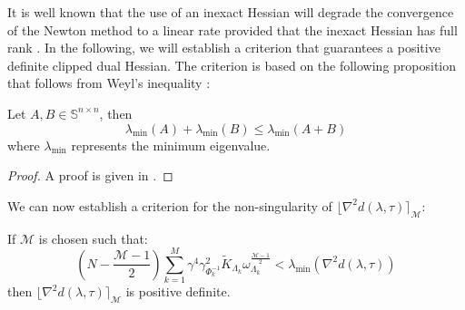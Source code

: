 It is well known that the use of an inexact Hessian will degrade the convergence of the Newton method to a linear rate provided that the inexact Hessian has full rank \cite{Nocedal2006}. In the following, we will establish a criterion that guarantees a positive definite clipped dual Hessian. The criterion is based on the following proposition that follows from Weyl's inequality \cite{HornR2013}:
\begin{proposition} \label{p:Weyl}
Let $A, B \in \mathbb{S}^{n \times n}$, then
\begin{equation} \label{e:minEigenvalueLemma}
\lambda_{\min} (A) + \lambda_{\min} (B) \leq \lambda_{\min} (A + B)
\end{equation} 
where $\lambda_{\min}$ represents the minimum eigenvalue.
\end{proposition}
\begin{proof}
A proof is given in \cite{HornR2013}.
\end{proof}
We can now establish a criterion for the non-singularity of $\lfloor \nabla^2 d(\lambda, \tau) \rceil_{\mathcal{M}}$:
\begin{lemma} \label{l:nonsingularClippedHessian}
If $\mathcal{M}$ is chosen such that:
\begin{equation} \label{e:nonsingularClippedHessian}
\left( N -\frac{\mathcal{M} - 1}{2} \right) \sum_{k=1}^M \gamma^4 \gamma_{\Phi_k^{-1}}^2 \tilde{K}_{\Lambda_k} \omega_{\Lambda_k}^{\frac{\mathcal{M} - 1}{2}} < \lambda_{\min}( \nabla^2 d(\lambda, \tau) )
\end{equation}
then $\lfloor \nabla^2 d(\lambda, \tau) \rceil_{\mathcal{M}}$ is positive definite.
\end{lemma}
